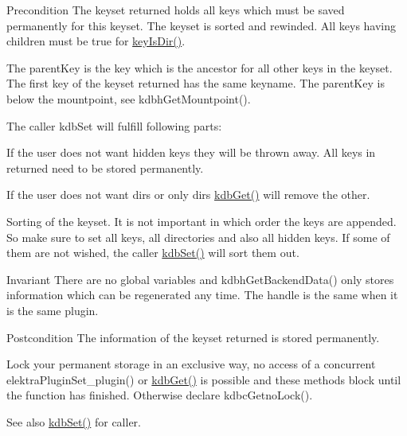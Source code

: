 \begin{DoxyPrecond}{Precondition}
The keyset {\ttfamily returned} holds all keys which must be saved permanently for this keyset. The keyset is sorted and rewinded. All keys having children must be true for \hyperlink{group__keytest_gac0a10c602d52a35f81347e8a32312017}{keyIsDir()}.

The {\ttfamily parentKey} is the key which is the ancestor for all other keys in the keyset. The first key of the keyset {\ttfamily returned} has the same keyname. The parentKey is below the mountpoint, see kdbhGetMountpoint().

The caller kdbSet will fulfill following parts:
\begin{DoxyItemize}
\item If the user does not want hidden keys they will be thrown away. All keys in {\ttfamily returned} need to be stored permanently.
\item If the user does not want dirs or only dirs \hyperlink{group__kdb_ga28e385fd9cb7ccfe0b2f1ed2f62453a1}{kdbGet()} will remove the other.
\item Sorting of the keyset. It is not important in which order the keys are appended. So make sure to set all keys, all directories and also all hidden keys. If some of them are not wished, the caller \hyperlink{group__kdb_ga11436b058408f83d303ca5e996832bcf}{kdbSet()} will sort them out.
\end{DoxyItemize}
\end{DoxyPrecond}
\begin{DoxyInvariant}{Invariant}
There are no global variables and kdbhGetBackendData() only stores information which can be regenerated any time. The handle is the same when it is the same plugin.
\end{DoxyInvariant}
\begin{DoxyPostcond}{Postcondition}
The information of the keyset {\ttfamily returned} is stored permanently.
\end{DoxyPostcond}
Lock your permanent storage in an exclusive way, no access of a concurrent elektraPluginSet\_\-plugin() or \hyperlink{group__kdb_ga28e385fd9cb7ccfe0b2f1ed2f62453a1}{kdbGet()} is possible and these methods block until the function has finished. Otherwise declare kdbcGetnoLock().

\begin{DoxySeeAlso}{See also}
\hyperlink{group__kdb_ga11436b058408f83d303ca5e996832bcf}{kdbSet()} for caller.
\end{DoxySeeAlso}


